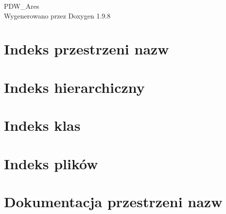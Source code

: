 \documentclass[twoside]{book}
\newcommand{\+}{\discretionary{\mbox{\scriptsize$\hookleftarrow$}}{}{}}
\newcommand{\clearemptydoublepage}{%
    \newpage{\pagestyle{empty}\cleardoublepage}%
  }
\begin{document}
  \raggedbottom
    \hypersetup{pageanchor=false,
                bookmarksnumbered=true,
                pdfencoding=unicode
               }
  \begin{titlepage}
  \vspace*{7cm}
  \begin{center}%
  {\Large PDW\+\_\+\+Ares}\\
  \vspace*{1cm}
  {\large Wygenerowano przez Doxygen 1.9.8}\\
  \end{center}
  \end{titlepage}
  \clearemptydoublepage
  \tableofcontents
  \clearemptydoublepage
  \hypersetup{pageanchor=true}
\chapter{Indeks przestrzeni nazw}

\chapter{Indeks hierarchiczny}

\chapter{Indeks klas}

\chapter{Indeks plików}

\chapter{Dokumentacja przestrzeni nazw}


\end{document}
